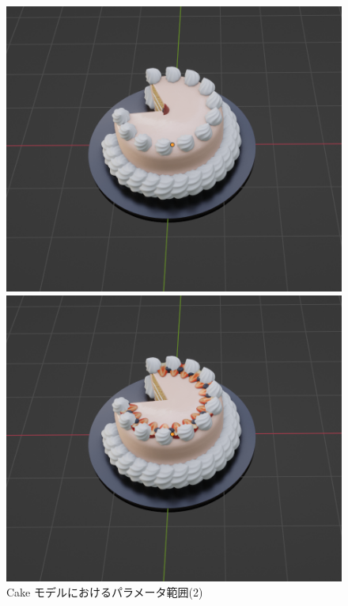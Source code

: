 \begin{figure}[h]
\begin{minipage}[b]{0.48\linewidth}
 \end{minipage}\\
 \begin{minipage}[b]{0.48\linewidth}
  \centering
  \includegraphics[scale=0.25]{./imgs/cakeParamMean/toppingPosMin.png}
 \end{minipage}
 \begin{minipage}[b]{0.48\linewidth}
  \centering
  \includegraphics[scale=0.25]{./imgs/cakeParamMean/toppingPosMax.png}
 \end{minipage}
 \caption{Cake モデルにおけるパラメータ範囲(2)}\label{fig:cakeParamMean_2}
\end{figure}

